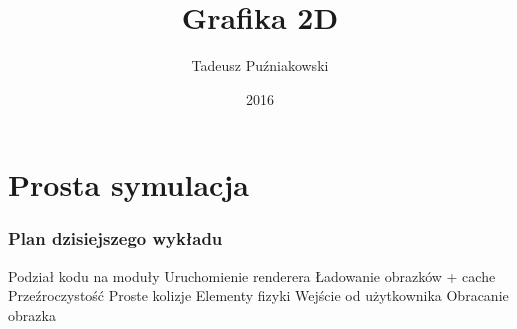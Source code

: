\documentclass{beamer}
\title[SGD 3]{Grafika 2D}
\author{Tadeusz Puźniakowski}
\institute{PJATK}
\date{2016}
\begin{document}


\frame{\titlepage}

\section{Prosta symulacja}

\begin{frame}[fragile]
	\frametitle{Plan dzisiejszego wykładu}
	\BI
	\I Podział kodu na moduły
	\I Uruchomienie renderera
	\I Ładowanie obrazków + cache
	\I Przeźroczystość
	\I Proste kolizje
	\I Elementy fizyki
	\I Wejście od użytkownika
	\I Obracanie obrazka
	\EI
	\EB
\end{frame}
\end{document}
